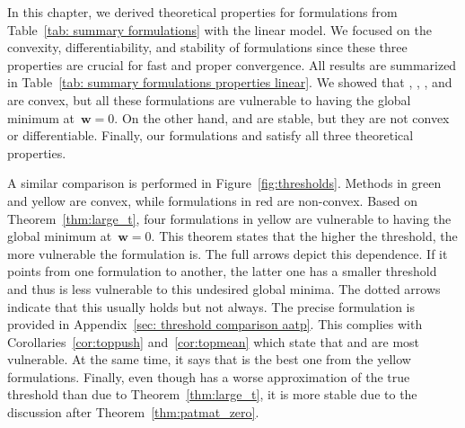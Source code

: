 In this chapter, we derived theoretical properties for formulations from Table~\ref{tab: summary formulations} with the linear model. We focused on the convexity, differentiability, and stability of formulations since these three properties are crucial for fast and proper convergence. All results are summarized in Table~\ref{tab: summary formulations properties linear}. We showed that \TopPush, \TopPushK, \TopMeanK, and \tauFPL are convex, but all these formulations are vulnerable to having the global minimum at~$\bm{w}=0$. On the other hand, \Grill and \GrillNP are stable, but they are not convex or differentiable. Finally, our formulations \PatMat and \PatMatNP satisfy all three theoretical properties. 

A similar comparison is performed in Figure~\ref{fig:thresholds}. Methods in green and yellow are convex, while formulations in red are non-convex. Based on Theorem~\ref{thm:large_t}, four formulations in yellow are vulnerable to having the global minimum at~$\bm{w}=0$. This theorem states that the higher the threshold, the more vulnerable the formulation is. The full arrows depict this dependence. If it points from one formulation to another, the latter one has a smaller threshold and thus is less vulnerable to this undesired global minima. The dotted arrows indicate that this usually holds but not always. The precise formulation is provided in Appendix~\ref{sec: threshold comparison aatp}. This complies with Corollaries~\ref{cor:toppush} and~\ref{cor:topmean} which state that \TopPush and \TopMeanK are most vulnerable. At the same time, it says that \tauFPL is the best one from the yellow formulations. Finally, even though \PatMatNP has a worse approximation of the true threshold than \tauFPL due to Theorem~\ref{thm:large_t}, it is more stable due to the discussion after Theorem~\ref{thm:patmat_zero}.

